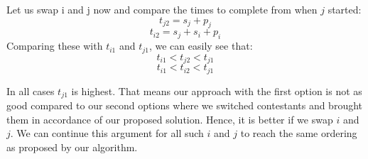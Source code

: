 \documentclass[11pt]{article}
\begin{document}
Let us swap i and j now and compare the times to complete from when $ j $ started:
\begin{equation*}
t_{j2} = s_j + p_j
\end{equation*}
\begin{equation*}
t_{i2} = s_j + s_i + p_i
\end{equation*}
Comparing these with $t_{i1} $ and $ t_{j1} $, we can easily see that:
\begin{equation*}
t_{i1} < t_{j2} < t_{j1}
\end{equation*}
\begin{equation*}
t_{i1} < t_{i2} < t_{j1}
\end{equation*}

In all cases $ t_{j1} $ is highest. That means our approach with the first option is not as good compared to our second options where we switched contestants and brought them in accordance of our proposed solution. Hence, it is better if we swap $ i $ and $ j $. We can continue this argument for all such $ i $ and $ j $ to reach the same ordering as proposed by our algorithm.

\clearpage
\end{document}
